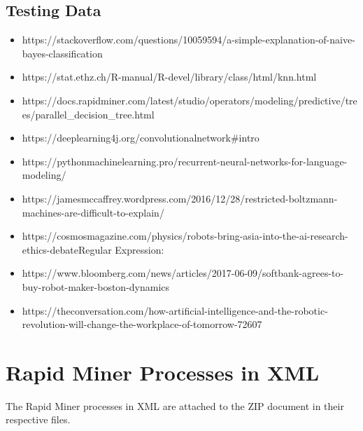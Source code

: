 \subsection{Testing Data}
\begin{itemize}

\item https://stackoverflow.com/questions/10059594/a-simple-explanation-of-naive-bayes-classification

\item https://stat.ethz.ch/R-manual/R-devel/library/class/html/knn.html

\item https://docs.rapidminer.com/latest/studio/operators/modeling/predictive/trees/parallel\_decision\_tree.html

\item https://deeplearning4j.org/convolutionalnetwork\#intro

\item https://pythonmachinelearning.pro/recurrent-neural-networks-for-language-modeling/

\item https://jamesmccaffrey.wordpress.com/2016/12/28/restricted-boltzmann-machines-are-difficult-to-explain/

\item https://cosmosmagazine.com/physics/robots-bring-asia-into-the-ai-research-ethics-debateRegular Expression: 

\item https://www.bloomberg.com/news/articles/2017-06-09/softbank-agrees-to-buy-robot-maker-boston-dynamics

\item https://theconversation.com/how-artificial-intelligence-and-the-robotic-revolution-will-change-the-workplace-of-tomorrow-72607

\end{itemize}


\newpage

\section{Rapid Miner Processes in XML}
The Rapid Miner processes in XML are attached to the ZIP document in their respective files.

\newpage

